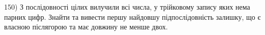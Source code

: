 \documentclass[11pt, ukrainian]{article}
\begin{document}
\par
\vspace{0.9cm}
150) \space 
З послідовності цілих вилучили всі числа, у трійковому запису яких нема парних цифр. Знайти та вивести першу найдовшу підпослідовність залишку, що є власною післягорою та має довжину не менше двох.

\par
\vspace{0.9cm}
\end{document}
